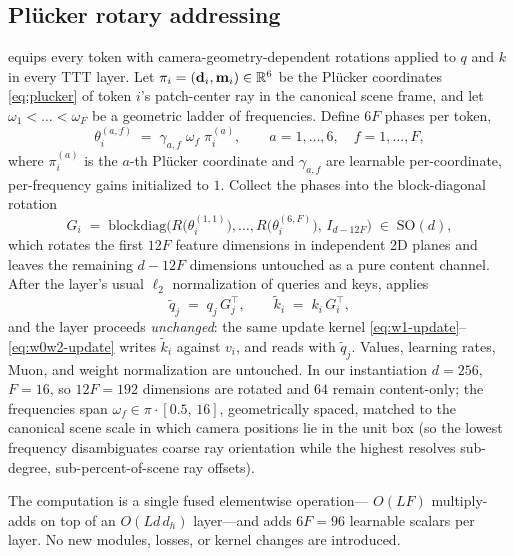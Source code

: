 \subsection{Plücker rotary addressing}
\label{sec:method-pra}

\ours{} equips every token with camera-geometry-dependent rotations applied
to $q$ and $k$ in every TTT layer. Let $\pi_i = (\mathbf{d}_i, \mathbf{m}_i)
\in \mathbb{R}^6$ be the Plücker coordinates \eqref{eq:plucker} of token $i$'s
patch-center ray in the canonical scene frame, and let
$\omega_1 < \dots < \omega_F$ be a geometric ladder of frequencies. Define
$6F$ phases per token,
\begin{equation}
\label{eq:phases}
\theta_i^{(a,f)} \;=\; \gamma_{a,f}\;\omega_f\; \pi_i^{(a)},
\qquad a = 1, \dots, 6,\quad f = 1, \dots, F,
\end{equation}
where $\pi_i^{(a)}$ is the $a$-th Plücker coordinate and $\gamma_{a,f}$ are
learnable per-coordinate, per-frequency gains initialized to $1$. Collect
the phases into the block-diagonal rotation
\begin{equation}
\label{eq:block-rot}
G_i \;=\;
\mathrm{blockdiag}\Big(
R\big(\theta_i^{(1,1)}\big), \dots, R\big(\theta_i^{(6,F)}\big),\,
I_{d - 12F}
\Big) \;\in\; \mathrm{SO}(d),
\end{equation}
which rotates the first $12F$ feature dimensions in independent 2D planes
and leaves the remaining $d - 12F$ dimensions untouched as a pure content
channel. After the layer's usual $\ell_2$ normalization of queries and
keys, \ours{} applies
\begin{equation}
\label{eq:pra-apply}
\tilde q_j \;=\; q_j\, G_{j}^{\top},
\qquad
\tilde k_i \;=\; k_i\, G_{i}^{\top},
\end{equation}
and the layer proceeds \emph{unchanged}: the same update kernel
\eqref{eq:w1-update}--\eqref{eq:w0w2-update} writes $\tilde k_i$ against
$v_i$, and reads with $\tilde q_j$. Values, learning rates, Muon, and
weight normalization are untouched. In our instantiation $d = 256$,
$F = 16$, so $12F = 192$ dimensions are rotated and $64$ remain
content-only; the frequencies span
$\omega_f \in \pi \cdot [0.5,\, 16]$, geometrically spaced, matched to the
canonical scene scale in which camera positions lie in the unit box (so the
lowest frequency disambiguates coarse ray orientation while the highest
resolves sub-degree, sub-percent-of-scene ray offsets).

The computation is a single fused elementwise operation--- $O(LF)$
multiply-adds on top of an $O(L d\, d_h)$ layer---and adds $6F = 96$
learnable scalars per layer. No new modules, losses, or kernel changes are
introduced.

